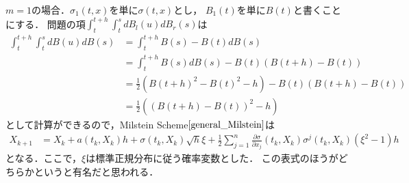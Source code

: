 \documentclass[dvipdfmx,autodetect-engine]{jsarticle}
\theoremstyle{remark}
\theoremstyle{definition}
\begin{document}
$m=1$の場合．$\sigma_{1}(t,x)$を単に$\sigma(t,x)$とし，
$B_{1}(t)$を単に$B(t)$と書くことにする．
問題の項$\int_{t}^{t+h} \int_{t}^{s} dB_{l}(u) dB_{r}(s)$は
\begin{align}
    \int_{t}^{t+h} \int_{t}^{s} dB(u) dB(s) 
    &= \int_{t}^{t+h} B(s)-B(t) dB(s) \\
    &= \int_{t}^{t+h} B(s) dB(s) - B(t)(B(t+h)-B(t)) \\
    &= \frac{1}{2}\left(B(t+h)^{2} - B(t)^{2} - h\right) - B(t)(B(t+h)-B(t)) \\
    &= \frac{1}{2}\left((B(t+h)-B(t))^{2} -h\right)
\end{align}
として計算ができるので，Milstein Scheme$\eqref{general_Milstein}$は
\begin{align}
    X_{k+1} &= X_{k} + a(t_{k},X_{k})h 
     + \sigma(t_{k},X_{k})\sqrt{h}\xi + \frac{1}{2}
     \sum_{j=1}^{n} \frac{\partial \sigma}{\partial x_{j}}
     (t_{k},X_{k})\sigma^{j} (t_{k},X_{k}) (\xi^2 - 1)h
\end{align}
となる．ここで，$\xi$は標準正規分布に従う確率変数とした．
この表式のほうがどちらかというと有名だと思われる．
\end{document}
